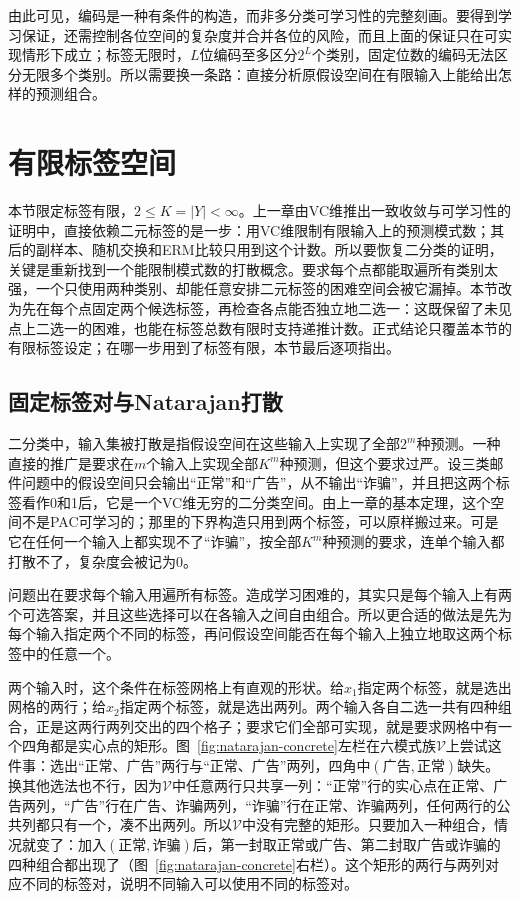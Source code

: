 由此可见，编码是一种有条件的构造，而非多分类可学习性的完整刻画。要得到学习保证，还需控制各位空间的复杂度并合并各位的风险，而且上面的保证只在可实现情形下成立；标签无限时，$L$位编码至多区分$2^L$个类别，固定位数的编码无法区分无限多个类别。所以需要换一条路：直接分析原假设空间在有限输入上能给出怎样的预测组合。

\section{有限标签空间}
\label{sec:multiclass-dimensions}
\label{sec:comb-multiclass-dimensions}

本节限定标签有限，$2\leq K=|Y|<\infty$。上一章由VC维推出一致收敛与可学习性的证明中，直接依赖二元标签的是一步：用VC维限制有限输入上的预测模式数；其后的副样本、随机交换和ERM比较只用到这个计数。所以要恢复二分类的证明，关键是重新找到一个能限制模式数的打散概念。要求每个点都能取遍所有类别太强，一个只使用两种类别、却能任意安排二元标签的困难空间会被它漏掉。本节改为先在每个点固定两个候选标签，再检查各点能否独立地二选一：这既保留了未见点上二选一的困难，也能在标签总数有限时支持递推计数。正式结论只覆盖本节的有限标签设定；在哪一步用到了标签有限，本节最后逐项指出。

\subsection{固定标签对与Natarajan打散}
\label{sec:comb-fixed-label-pairs}

二分类中，输入集被打散是指假设空间在这些输入上实现了全部$2^m$种预测。一种直接的推广是要求在$m$个输入上实现全部$K^m$种预测，但这个要求过严。设三类邮件问题中的假设空间只会输出“正常”和“广告”，从不输出“诈骗”，并且把这两个标签看作0和1后，它是一个VC维无穷的二分类空间。由上一章的基本定理，这个空间不是PAC可学习的；那里的下界构造只用到两个标签，可以原样搬过来。可是它在任何一个输入上都实现不了“诈骗”，按全部$K^m$种预测的要求，连单个输入都打散不了，复杂度会被记为0。

问题出在要求每个输入用遍所有标签。造成学习困难的，其实只是每个输入上有两个可选答案，并且这些选择可以在各输入之间自由组合。所以更合适的做法是先为每个输入指定两个不同的标签，再问假设空间能否在每个输入上独立地取这两个标签中的任意一个。

两个输入时，这个条件在标签网格上有直观的形状。给$x_1$指定两个标签，就是选出网格的两行；给$x_2$指定两个标签，就是选出两列。两个输入各自二选一共有四种组合，正是这两行两列交出的四个格子；要求它们全部可实现，就是要求网格中有一个四角都是实心点的矩形。图~\ref{fig:natarajan-concrete}左栏在六模式族$\mathcal V$上尝试这件事：选出“正常、广告”两行与“正常、广告”两列，四角中$(\text{广告},\text{正常})$缺失。换其他选法也不行，因为$\mathcal V$中任意两行只共享一列：“正常”行的实心点在正常、广告两列，“广告”行在广告、诈骗两列，“诈骗”行在正常、诈骗两列，任何两行的公共列都只有一个，凑不出两列。所以$\mathcal V$中没有完整的矩形。只要加入一种组合，情况就变了：加入$(\text{正常},\text{诈骗})$后，第一封取正常或广告、第二封取广告或诈骗的四种组合都出现了（图~\ref{fig:natarajan-concrete}右栏）。这个矩形的两行与两列对应不同的标签对，说明不同输入可以使用不同的标签对。

